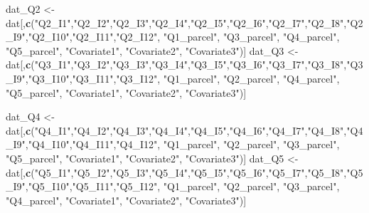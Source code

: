 \documentclass[]{book}
\newenvironment{Shaded}{\begin{snugshade}}{\end{snugshade}}
\newcommand{\KeywordTok}[1]{\textcolor[rgb]{0.13,0.29,0.53}{\textbf{#1}}}
\newcommand{\StringTok}[1]{\textcolor[rgb]{0.31,0.60,0.02}{#1}}
\newcommand{\NormalTok}[1]{#1}
\begin{document}
\begin{Shaded}
\begin{Highlighting}[]
\NormalTok{dat_Q2 <-}\StringTok{ }\NormalTok{dat[,}\KeywordTok{c}\NormalTok{(}\StringTok{"Q2_I1"}\NormalTok{,}\StringTok{"Q2_I2"}\NormalTok{,}\StringTok{"Q2_I3"}\NormalTok{,}\StringTok{"Q2_I4"}\NormalTok{,}\StringTok{"Q2_I5"}\NormalTok{,}\StringTok{"Q2_I6"}\NormalTok{,}\StringTok{"Q2_I7"}\NormalTok{,}\StringTok{"Q2_I8"}\NormalTok{,}\StringTok{"Q2_I9"}\NormalTok{,}\StringTok{"Q2_I10"}\NormalTok{,}\StringTok{"Q2_I11"}\NormalTok{,}\StringTok{"Q2_I12"}\NormalTok{, }
                    \StringTok{"Q1_parcel"}\NormalTok{, }\StringTok{"Q3_parcel"}\NormalTok{, }\StringTok{"Q4_parcel"}\NormalTok{, }\StringTok{"Q5_parcel"}\NormalTok{,}
                    \StringTok{"Covariate1"}\NormalTok{, }\StringTok{"Covariate2"}\NormalTok{, }\StringTok{"Covariate3"}\NormalTok{)]}
\NormalTok{dat_Q3 <-}\StringTok{ }\NormalTok{dat[,}\KeywordTok{c}\NormalTok{(}\StringTok{"Q3_I1"}\NormalTok{,}\StringTok{"Q3_I2"}\NormalTok{,}\StringTok{"Q3_I3"}\NormalTok{,}\StringTok{"Q3_I4"}\NormalTok{,}\StringTok{"Q3_I5"}\NormalTok{,}\StringTok{"Q3_I6"}\NormalTok{,}\StringTok{"Q3_I7"}\NormalTok{,}\StringTok{"Q3_I8"}\NormalTok{,}\StringTok{"Q3_I9"}\NormalTok{,}\StringTok{"Q3_I10"}\NormalTok{,}\StringTok{"Q3_I11"}\NormalTok{,}\StringTok{"Q3_I12"}\NormalTok{, }
                    \StringTok{"Q1_parcel"}\NormalTok{, }\StringTok{"Q2_parcel"}\NormalTok{, }\StringTok{"Q4_parcel"}\NormalTok{, }\StringTok{"Q5_parcel"}\NormalTok{,}
                    \StringTok{"Covariate1"}\NormalTok{, }\StringTok{"Covariate2"}\NormalTok{, }\StringTok{"Covariate3"}\NormalTok{)]}

\NormalTok{dat_Q4 <-}\StringTok{ }\NormalTok{dat[,}\KeywordTok{c}\NormalTok{(}\StringTok{"Q4_I1"}\NormalTok{,}\StringTok{"Q4_I2"}\NormalTok{,}\StringTok{"Q4_I3"}\NormalTok{,}\StringTok{"Q4_I4"}\NormalTok{,}\StringTok{"Q4_I5"}\NormalTok{,}\StringTok{"Q4_I6"}\NormalTok{,}\StringTok{"Q4_I7"}\NormalTok{,}\StringTok{"Q4_I8"}\NormalTok{,}\StringTok{"Q4_I9"}\NormalTok{,}\StringTok{"Q4_I10"}\NormalTok{,}\StringTok{"Q4_I11"}\NormalTok{,}\StringTok{"Q4_I12"}\NormalTok{, }
                    \StringTok{"Q1_parcel"}\NormalTok{, }\StringTok{"Q2_parcel"}\NormalTok{, }\StringTok{"Q3_parcel"}\NormalTok{, }\StringTok{"Q5_parcel"}\NormalTok{,}
                    \StringTok{"Covariate1"}\NormalTok{, }\StringTok{"Covariate2"}\NormalTok{, }\StringTok{"Covariate3"}\NormalTok{)]}
\NormalTok{dat_Q5 <-}\StringTok{ }\NormalTok{dat[,}\KeywordTok{c}\NormalTok{(}\StringTok{"Q5_I1"}\NormalTok{,}\StringTok{"Q5_I2"}\NormalTok{,}\StringTok{"Q5_I3"}\NormalTok{,}\StringTok{"Q5_I4"}\NormalTok{,}\StringTok{"Q5_I5"}\NormalTok{,}\StringTok{"Q5_I6"}\NormalTok{,}\StringTok{"Q5_I7"}\NormalTok{,}\StringTok{"Q5_I8"}\NormalTok{,}\StringTok{"Q5_I9"}\NormalTok{,}\StringTok{"Q5_I10"}\NormalTok{,}\StringTok{"Q5_I11"}\NormalTok{,}\StringTok{"Q5_I12"}\NormalTok{, }
                    \StringTok{"Q1_parcel"}\NormalTok{, }\StringTok{"Q2_parcel"}\NormalTok{, }\StringTok{"Q3_parcel"}\NormalTok{, }\StringTok{"Q4_parcel"}\NormalTok{,}
                    \StringTok{"Covariate1"}\NormalTok{, }\StringTok{"Covariate2"}\NormalTok{, }\StringTok{"Covariate3"}\NormalTok{)]}
\end{Highlighting}
\end{Shaded}
\end{document}
